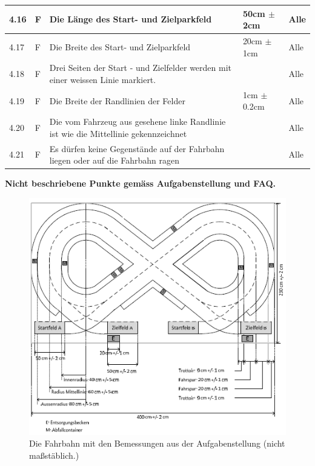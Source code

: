 \begin{center}
\begin{tabular}{|p{1cm}|p{0.5cm}|p{5cm}|p{5cm}|p{1.5cm}|}
 4.16 & F & Die Länge des Start- und Zielparkfeld & 50cm $\pm$ 2cm & Alle\\ \hline
 4.17 & F & Die Breite des Start- und Zielparkfeld & 20cm $\pm$ 1cm & Alle\\ \hline
 4.18 & F & Drei Seiten der Start - und Zielfelder werden mit einer weissen Linie markiert. & & Alle\\ \hline
 4.19 & F & Die Breite der Randlinien der Felder & 1cm $\pm$ 0.2cm & Alle\\ \hline
 4.20 & F & Die vom Fahrzeug aus gesehene linke Randlinie ist wie die Mittellinie gekennzeichnet & & Alle\\\hline
 4.21 & F & Es dürfen keine Gegenstände auf der Fahrbahn liegen oder auf die Fahrbahn ragen & & Alle\\\hline
\end{tabular}
 \textbf{Nicht beschriebene Punkte gemäss Aufgabenstellung und FAQ.}
\end{center}

\begin{figure}[ht]
	\centering									
	\includegraphics{Images/Fahrbahn.png}
	\caption{Die Fahrbahn mit den Bemessungen aus der Aufgabenstellung (nicht maßstäblich.)}
	\label{fig1}
\end{figure}